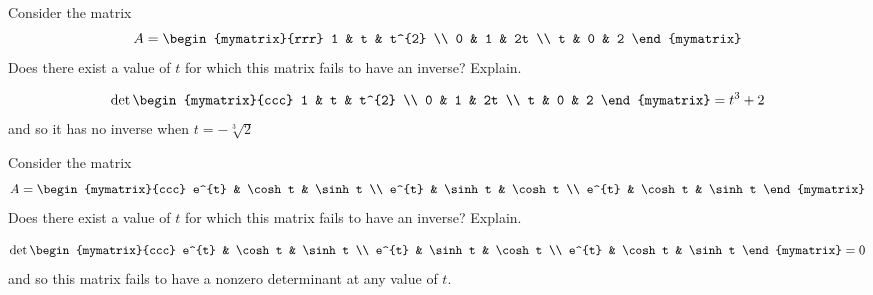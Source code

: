 \begin{enumialphparenastyle}
\begin{ex} Consider the matrix 
\begin{equation*}
A = 
\begin{mymatrix}{rrr}
1 & t & t^{2} \\
0 & 1 & 2t \\
t & 0 & 2
\end{mymatrix}
\end{equation*}
Does there exist a value of $t$ for which this matrix fails to have an
inverse? Explain.
\begin{sol}
\[
\det \begin{mymatrix}{ccc}
1 & t & t^{2} \\
0 & 1 & 2t \\
t & 0 & 2
\end{mymatrix} = t^{3}+2
\]
and so it has no inverse when $t=-\sqrt[3]{2}$
\end{sol}
\end{ex}

\begin{ex} Consider the matrix 
\begin{equation*}
A = 
\begin{mymatrix}{ccc}
e^{t} & \cosh t & \sinh t \\
e^{t} & \sinh t & \cosh t \\
e^{t} & \cosh t & \sinh t
\end{mymatrix}
\end{equation*}
Does there exist a value of $t$ for which this matrix fails to have an
inverse? Explain.
\begin{sol}
\[
\det \begin{mymatrix}{ccc}
e^{t} & \cosh t & \sinh t \\
e^{t} & \sinh t & \cosh t \\
e^{t} & \cosh t & \sinh t
\end{mymatrix} = 0
\]
and so this matrix fails to have a nonzero determinant at any value of $t$.
\end{sol}
\end{ex}


\end{enumialphparenastyle}
